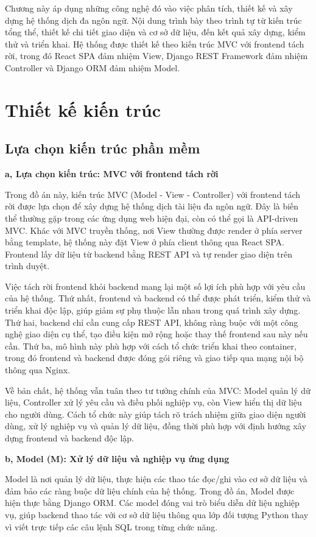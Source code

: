 ﻿\documentclass[../DoAn.tex]{subfiles}
\begin{document}
Chương này áp dụng những công nghệ đó vào việc phân tích, thiết kế và xây dựng hệ thống dịch đa ngôn ngữ. Nội dung trình bày theo trình tự từ kiến trúc tổng thể, thiết kế chi tiết giao diện và cơ sở dữ liệu, đến kết quả xây dựng, kiểm thử và triển khai. Hệ thống được thiết kế theo kiến trúc MVC với frontend tách rời, trong đó React SPA đảm nhiệm View, Django REST Framework đảm nhiệm Controller và Django ORM đảm nhiệm Model.

\section{Thiết kế kiến trúc}
\subsection{Lựa chọn kiến trúc phần mềm}
\textbf{a, Lựa chọn kiến trúc: MVC với frontend tách rời}

Trong đồ án này, kiến trúc MVC (Model - View - Controller) với frontend tách rời được lựa chọn để xây dựng hệ thống dịch tài liệu đa ngôn ngữ. Đây là biến thể thường gặp trong các ứng dụng web hiện đại, còn có thể gọi là API-driven MVC. Khác với MVC truyền thống, nơi View thường được render ở phía server bằng template, hệ thống này đặt View ở phía client thông qua React SPA. Frontend lấy dữ liệu từ backend bằng REST API và tự render giao diện trên trình duyệt.

Việc tách rời frontend khỏi backend mang lại một số lợi ích phù hợp với yêu cầu của hệ thống. Thứ nhất, frontend và backend có thể được phát triển, kiểm thử và triển khai độc lập, giúp giảm sự phụ thuộc lẫn nhau trong quá trình xây dựng. Thứ hai, backend chỉ cần cung cấp REST API, không ràng buộc với một công nghệ giao diện cụ thể, tạo điều kiện mở rộng hoặc thay thế frontend sau này nếu cần. Thứ ba, mô hình này phù hợp với cách tổ chức triển khai theo container, trong đó frontend và backend được đóng gói riêng và giao tiếp qua mạng nội bộ thông qua Nginx.

Về bản chất, hệ thống vẫn tuân theo tư tưởng chính của MVC: Model quản lý dữ liệu, Controller xử lý yêu cầu và điều phối nghiệp vụ, còn View hiển thị dữ liệu cho người dùng. Cách tổ chức này giúp tách rõ trách nhiệm giữa giao diện người dùng, xử lý nghiệp vụ và quản lý dữ liệu, đồng thời phù hợp với định hướng xây dựng frontend và backend độc lập.

\textbf{b, Model (M): Xử lý dữ liệu và nghiệp vụ ứng dụng}

Model là nơi quản lý dữ liệu, thực hiện các thao tác đọc/ghi vào cơ sở dữ liệu và đảm bảo các ràng buộc dữ liệu chính của hệ thống. Trong đồ án, Model được hiện thực bằng Django ORM. Các model đóng vai trò biểu diễn dữ liệu nghiệp vụ, giúp backend thao tác với cơ sở dữ liệu thông qua lớp đối tượng Python thay vì viết trực tiếp các câu lệnh SQL trong từng chức năng.
\end{document}
